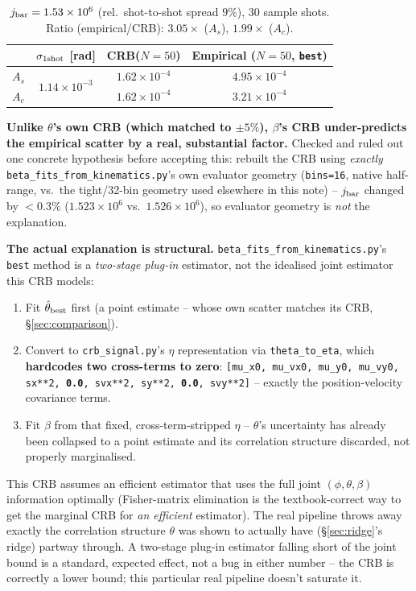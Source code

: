 \documentclass[11pt,a4paper]{article}
\newcommand{\code}[1]{\texttt{#1}}
\begin{document}
\begin{table}[h]
\centering
\begin{tabular}{lccc}
\toprule
& $\sigma_{\rm 1shot}$ [rad] & CRB($N{=}50$) & Empirical ($N{=}50$, \code{best}) \\
\midrule
$A_s$ & \multirow{2}{*}{$1.14\times10^{-3}$} & $1.62\times10^{-4}$ & $4.95\times10^{-4}$ \\
$A_c$ & & $1.62\times10^{-4}$ & $3.21\times10^{-4}$ \\
\bottomrule
\end{tabular}
\caption{$j_{\rm bar}=1.53\times10^6$ (rel.\ shot-to-shot spread $9\%$), 30
sample shots. Ratio (empirical/CRB): $3.05\times$ ($A_s$), $1.99\times$
($A_c$).}
\end{table}

\textbf{Unlike $\theta$'s own CRB (which matched to $\pm5\%$), $\beta$'s CRB
under-predicts the empirical scatter by a real, substantial factor.} Checked
and ruled out one concrete hypothesis before accepting this: rebuilt the CRB
using \emph{exactly} \code{beta\_fits\_from\_kinematics.py}'s own evaluator
geometry (\code{bins=16}, native half-range, vs.\ the tight/32-bin geometry
used elsewhere in this note) -- $j_{\rm bar}$ changed by $<0.3\%$
($1.523\times10^6$ vs.\ $1.526\times10^6$), so evaluator geometry is
\emph{not} the explanation.

\textbf{The actual explanation is structural.} \code{beta\_fits\_from\_kinematics.py}'s
\code{best} method is a \emph{two-stage plug-in} estimator, not the
idealised joint estimator this CRB models:
\begin{enumerate}
  \item Fit $\hat\theta_{\rm best}$ first (a point estimate -- whose own
    scatter matches its CRB, \S\ref{sec:comparison}).
  \item Convert to \code{crb\_signal.py}'s $\eta$ representation via
    \code{theta\_to\_eta}, which \textbf{hardcodes two cross-terms to
    zero}: \verb|[mu_x0, mu_vx0, mu_y0, mu_vy0, sx**2, |\textbf{\texttt{0.0}}\verb|, svx**2, sy**2, |\textbf{\texttt{0.0}}\verb|, svy**2]|
    -- exactly the position-velocity covariance terms.
  \item Fit $\beta$ from that fixed, cross-term-stripped $\eta$ -- $\theta$'s
    uncertainty has already been collapsed to a point estimate and its
    correlation structure discarded, not properly marginalised.
\end{enumerate}
This CRB assumes an efficient estimator that uses the full joint
$(\phi,\theta,\beta)$ information optimally (Fisher-matrix elimination is
the textbook-correct way to get the marginal CRB for \emph{an efficient}
estimator). The real pipeline throws away exactly the correlation structure
$\theta$ was shown to actually have (\S\ref{sec:ridge}'s ridge) partway
through. A two-stage plug-in estimator falling short of the joint bound is a
standard, expected effect, not a bug in either number -- the CRB is
correctly a lower bound; this particular real pipeline doesn't saturate it.
\end{document}
